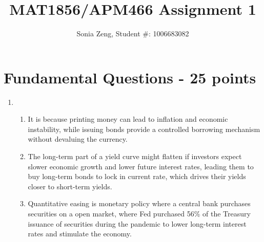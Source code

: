 \documentclass{article}
\title{MAT1856/APM466 Assignment 1}
\author{Sonia Zeng, Student \#: 1006683082} \date{}
\begin{document}
\maketitle

\section*{Fundamental Questions - 25 points}

\begin{enumerate}
    \item
    \begin{enumerate}
        \item It is because printing money can lead to inflation and economic instability, while issuing bonds provide a controlled borrowing mechanism without devaluing the currency.

        \item The long-term part of a yield curve might flatten if investors expect slower economic growth and lower future interest rates, leading them to buy long-term bonds to lock in current rate, which drives their yields closer to short-term yields.

        \item Quantitative easing is monetary policy where a central bank purchases securities on a open market, where Fed purchased 56\% of the Treasury issuance of securities during the pandemic \cite{CRS2020} to lower long-term interest rates and stimulate the economy. 
    \end{enumerate}

    
    

\end{enumerate}
\end{document}
